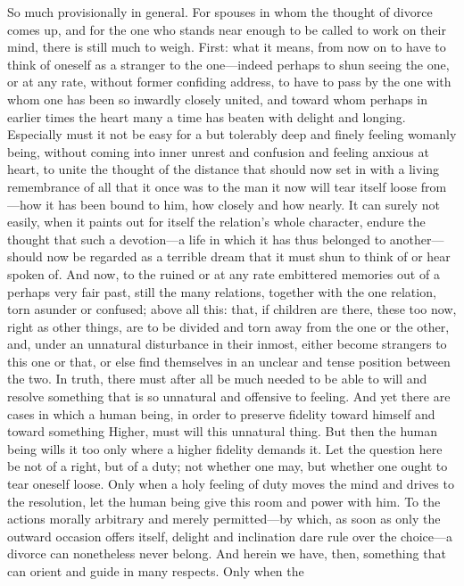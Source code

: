 \documentclass[12pt,a4paper]{book}
\begin{document}
So much provisionally in general. For spouses in whom the thought of
divorce comes up, and for the one who stands near enough to be called to
work on their mind, there is still much to weigh. First: what it means,
from now on to have to think of oneself as a stranger to the one---indeed
perhaps to shun seeing the one, or at any rate, without former confiding
address, to have to pass by the one with whom one has been so inwardly
closely united, and toward whom perhaps in earlier times the heart many a
time has beaten with delight and longing. Especially must it not be easy
for a but tolerably deep and finely feeling womanly being, without coming
into inner unrest and confusion and feeling anxious at heart, to unite the
thought of the distance that should now set in with a living remembrance of
all that it once was to the man it now will tear itself loose from---how it
has been bound to him, how closely and how nearly. It can surely not
easily, when it paints out for itself the relation's whole character,
endure the thought that such a devotion---a life in which it has thus
belonged to another---should now be regarded as a terrible dream that it
must shun to think of or hear spoken of. And now, to the ruined or at any
rate embittered memories out of a perhaps very fair past, still the many
relations, together with the one relation, torn asunder or confused; above
all this: that, if children are there, these too now, right as other
things, are to be divided and torn away from the one or the other, and,
under an unnatural disturbance in their inmost, either become strangers to
this one or that, or else find themselves in an unclear and tense position
between the two. In truth, there must after all be much needed to be able
to will and resolve something that is so unnatural and offensive to
feeling.
And yet there are cases in which a human being, in order to preserve
fidelity toward himself and toward something Higher, must will this
unnatural thing. But then the human being wills it too only where a higher
fidelity demands it. Let the question here be not of a right, but of a
duty; not whether one may, but whether one ought to tear oneself loose.
Only when a holy feeling of duty moves the mind and drives to the
resolution, let the human being give this room and power with him. To the
actions morally arbitrary and merely permitted---by which, as soon as only
the outward occasion offers itself, delight and inclination dare rule over
the choice---a divorce can nonetheless never belong. And herein we have,
then, something that can orient and guide in many respects. Only when the
\end{document}
